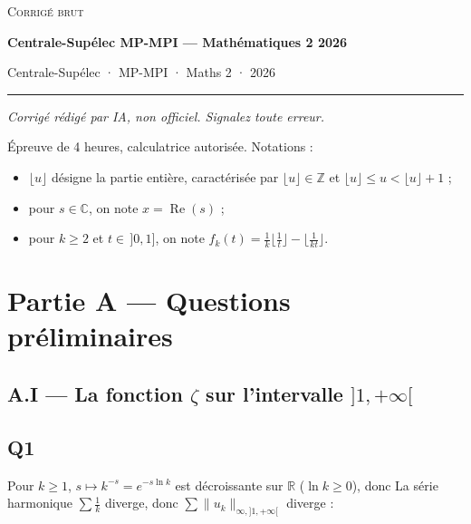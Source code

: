 \documentclass[11pt,a4paper]{article}
\providecommand{\tightlist}{\setlength{\itemsep}{0pt}\setlength{\parskip}{0pt}}
\newcommand{\equationajustee}[1]{%
  \sbox{\boiteequation}{$\displaystyle #1$}%
  \ifdim\wd\boiteequation>\linewidth
    \[\resizebox{\linewidth}{!}{\usebox{\boiteequation}}\]%
  \else
    \[#1\]%
  \fi}
\begin{document}
\thispagestyle{plain}
\begin{center}
  {\small\scshape Corrigé brut}\par\smallskip
  {\LARGE\bfseries Centrale-Supélec MP-MPI — Mathématiques 2 2026\par}\medskip
  {\large Centrale-Supélec · MP-MPI · Maths 2 · 2026\par}
\end{center}
\vspace{2pt}\hrule\vspace{8pt}

\emph{Corrigé rédigé par IA, non officiel. Signalez toute erreur.}

Épreuve de 4 heures, calculatrice autorisée. Notations :

\begin{itemize}
\tightlist
\item
  \(\lfloor u\rfloor\) désigne la partie entière, caractérisée par \(\lfloor u\rfloor\in\mathbb Z\) et \(\lfloor u\rfloor\leqslant u<\lfloor u\rfloor+1\) ;
\item
  pour \(s\in\mathbb C\), on note \(x=\operatorname{Re}(s)\) ;
\item
  pour \(k\geqslant 2\) et \(t\in\,]0,1]\), on note \(f_k(t)=\frac1k\lfloor\frac1t\rfloor-\lfloor\frac1{kt}\rfloor\).
\end{itemize}

\hypertarget{partie-a-questions-pruxe9liminaires}{%
\section{Partie A --- Questions préliminaires}\label{partie-a-questions-pruxe9liminaires}}

\hypertarget{a.i-la-fonction-zeta-sur-lintervalle-1infty}{%
\subsection{\texorpdfstring{A.I --- La fonction \(\zeta\) sur l'intervalle \(]1,+\infty[\)}{A.I --- La fonction \textbackslash zeta sur l'intervalle {]}1,+\textbackslash infty{[}}}\label{a.i-la-fonction-zeta-sur-lintervalle-1infty}}

\hypertarget{q1}{%
\subsection{Q1}\label{q1}}

Pour \(k\geqslant 1\), \(s\mapsto k^{-s}=e^{-s\ln k}\) est décroissante sur \(\mathbb R\) (\(\ln k\geqslant 0\)), donc
\equationajustee{\sup_{s>1}|u_k(s)|=\lim_{s\to1^+}k^{-s}=\frac1k .}
La série harmonique \(\sum\frac1k\) diverge, donc \(\sum\|u_k\|_{\infty,]1,+\infty[}\) diverge :
\end{document}
